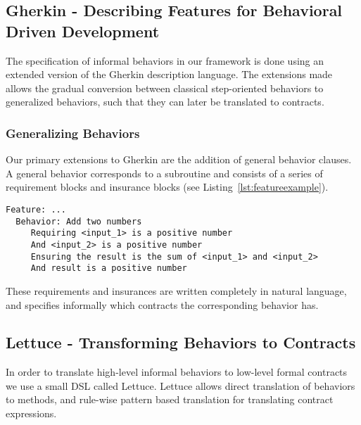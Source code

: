 \subsection{Gherkin - Describing Features for Behavioral Driven Development}
\label{sec:Gherkin - Describing Features for Behavioral Driven Development}

The specification of informal behaviors in our framework is done using an
extended version of the Gherkin description language.
The extensions made allows the gradual conversion between classical step-oriented behaviors to generalized behaviors, such that they can later be translated to contracts.


\subsubsection{Generalizing Behaviors}
\label{sub:Generalizing Behaviors}

Our primary extensions to Gherkin are the addition of general
behavior clauses. A general behavior corresponds to a subroutine
and consists of a series of requirement blocks and insurance blocks
(see Listing~\ref{lst:featureexample}).

\begin{lstlisting}[caption={General Behavior Description of Adding Natural Numbers},label={lst:featureexample}]
  Feature: ...
  Behavior: Add two numbers
     Requiring <input_1> is a positive number
     And <input_2> is a positive number
     Ensuring the result is the sum of <input_1> and <input_2>
     And result is a positive number
\end{lstlisting}

These requirements and insurances are written completely in
natural language, and specifies informally which contracts the corresponding
behavior has.

\subsection{Lettuce - Transforming Behaviors to Contracts}
\label{sub:Lettuce - Transforming Behaviors to Contracts}

In order to translate high-level informal behaviors to low-level formal
contracts we use a small DSL called Lettuce.
Lettuce allows direct translation of behaviors to methods,
and rule-wise pattern based translation for translating contract expressions.

